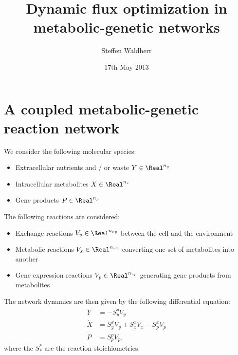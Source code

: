 \documentclass[a4paper,11pt,DIV12]{scrartcl}
\title{Dynamic flux optimization in metabolic-genetic networks}
\author{Steffen Waldherr}
\date{17th May 2013}
\theoremstyle{remark}
\begin{document}
\maketitle

\tableofcontents

\clearpage





\section{A coupled metabolic-genetic reaction network}
\label{sec:coupl-metab-genet}

We consider the following molecular species:
\begin{itemize}
\item Extracellular nutrients and / or waste $Y \in \Real^{n_y}$
\item Intracellular metabolites $X \in \Real^{n_x}$
\item Gene products $P \in \Real^{n_p}$
\end{itemize}

The following reactions are considered:
\begin{itemize}
\item Exchange reactions $V_y \in \Real^{n_{vy}}$ between the cell and the environment
\item Metabolic reactions $V_x \in \Real^{n_{vx}}$ converting one set of metabolites into another
\item Gene expression reactions $V_p \in \Real^{n_{vp}}$ generating gene products from metabolites
\end{itemize}

The network dynamics are then given by the following differential equation:
\begin{equation}
  \label{eq:metabolic-genetic-network}
  \begin{aligned}
    \dot Y &= - S^y_y V_y \\
    \dot X &= S^x_y V_y + S^x_x V_x - S^x_p V_p \\
    \dot P &= S^p_p V_p,
  \end{aligned}
\end{equation}
where the $S^\ast_\ast$ are the reaction stoichiometries.
\end{document}

